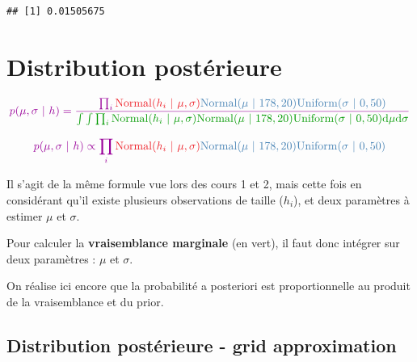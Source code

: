 \documentclass[
  a4paper,11pt,twoside,onecolumn,openright,final,oldfontcommands]{memoir}
\newenvironment{Shaded}{\begin{snugshade}}{\end{snugshade}}
\newcommand{\DecValTok}[1]{\textcolor[rgb]{0.00,0.00,0.81}{#1}}
\newcommand{\KeywordTok}[1]{\textcolor[rgb]{0.13,0.29,0.53}{\textbf{#1}}}
\newcommand{\NormalTok}[1]{#1}
\newcommand{\OperatorTok}[1]{\textcolor[rgb]{0.81,0.36,0.00}{\textbf{#1}}}
\theoremstyle{definition}
\theoremstyle{definition}
\theoremstyle{definition}
\theoremstyle{remark}
\begin{document}
\begin{Shaded}
\end{Shaded}

\begin{verbatim}
## [1] 0.01505675
\end{verbatim}

\hypertarget{distribution-postuxe9rieure}{%
\section{Distribution postérieure}\label{distribution-postuxe9rieure}}

\[
\color{purple}{p(\mu, \sigma \ | \ h)} = \frac{\prod_{i} \color{orangered}{\mathrm{Normal}(h_{i} \ | \ \mu, \sigma)}\color{steelblue}{\mathrm{Normal}(\mu \ | \ 178, 20)\mathrm{Uniform}(\sigma \ | \ 0, 50)}}
{\color{green}{\int \int \prod_{i} \mathrm{Normal}(h_{i} \ | \ \mu, \sigma)\mathrm{Normal}(\mu \ | \ 178, 20)\mathrm{Uniform}(\sigma \ | \ 0, 50) \mathrm{d} \mu \mathrm{d} \sigma}}
\]

\[
\color{purple}{p(\mu, \sigma \ | \ h)} \propto \prod_{i} \color{orangered}{\mathrm{Normal}(h_{i} \ | \ \mu, \sigma)}\color{steelblue}{\mathrm{Normal}(\mu \ | \ 178, 20)\mathrm{Uniform}(\sigma \ | \ 0, 50)}
\]

Il s'agit de la même formule vue lors des cours 1 et 2, mais cette fois en considérant qu'il existe plusieurs observations de taille (\(h_{i}\)), et deux paramètres à estimer \(\mu\) et \(\sigma\).

Pour calculer la \textbf{vraisemblance marginale} (en vert), il faut donc intégrer sur deux paramètres : \(\mu\) et \(\sigma\).

On réalise ici encore que la probabilité a posteriori est proportionnelle au produit de la vraisemblance et du prior.

\hypertarget{distribution-postuxe9rieure---grid-approximation}{%
\subsection{Distribution postérieure - grid approximation}\label{distribution-postuxe9rieure---grid-approximation}}
\end{document}
